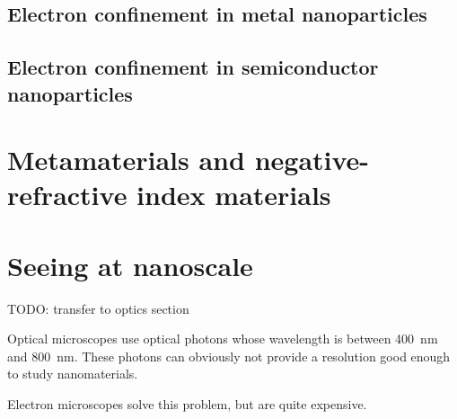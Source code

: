 \section{Electron confinement in metal nanoparticles}
\section{Electron confinement in semiconductor nanoparticles}
\chapter{Metamaterials and negative-refractive index materials}
\chapter{Seeing at nanoscale}
TODO: transfer to optics section

Optical microscopes use optical photons whose wavelength is between \SI{400}{nm} and \SI{800}{nm}. These photons can obviously not provide a resolution good enough to study nanomaterials.

Electron microscopes solve this problem, but are quite expensive.